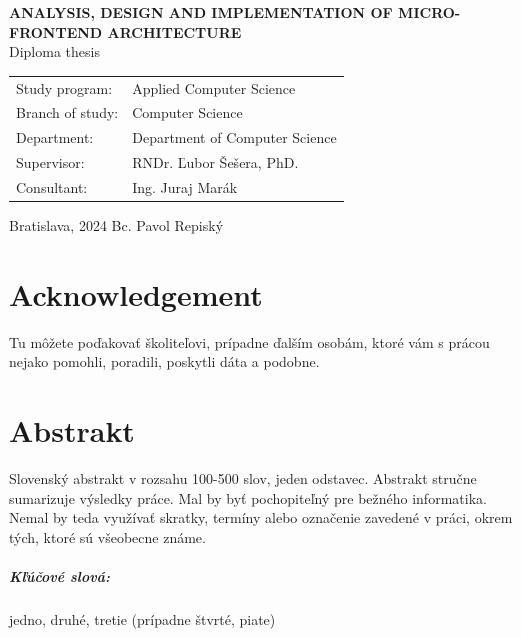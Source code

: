 \documentclass[12pt, twoside]{book}
\def\mfrok{2024}
\def\mftitle{Analysis, Design and Implementation of Micro-frontend Architecture}
\def\mfauthor{Bc. Pavol Repiský}
\def\mfskolitel{RNDr. Ľubor Šešera, PhD.}
\def\mfkonzultant{Ing. Juraj Marák}
\def\mfmiestocas{Bratislava, \mfrok}
\def\mftypprace{Diploma thesis}
\def\mfodbor{Computer Science}
\def\program{Applied Computer Science}
\def\mfpracovisko{Department of Computer Science}
\begin{document}
\begin{center}
	\textbf{\MakeUppercase{\Large\mftitle}}\\
	\mftypprace
\end{center}
\vfill


\begin{tabular}{l l}
Study program: & \program \\
Branch of study: & \mfodbor \\
Department: & \mfpracovisko \\
Supervisor: & \mfskolitel \\
Consultant: & \mfkonzultant \\
\end{tabular}

\vfill
\noindent
\mfmiestocas \hfill
\mfauthor
\cleardoublepage




\newpage
\setcounter{page}{2}




\newpage
\thispagestyle{empty}
\chapter*{Acknowledgement}\label{chap:thank_you}
Tu môžete poďakovať školiteľovi, prípadne
ďalším osobám, ktoré vám s prácou nejako pomohli, poradili,
poskytli dáta a podobne.

\vfill\eject 


\newpage 
\thispagestyle{empty}
\chapter*{Abstrakt}\label{chap:abstract_sk}
Slovenský abstrakt v rozsahu 100-500 slov, jeden odstavec. Abstrakt
stručne sumarizuje výsledky práce. Mal by byť pochopiteľný pre bežného
informatika. Nemal by teda využívať skratky, termíny alebo označenie
zavedené v práci, okrem tých, ktoré sú všeobecne známe.

\paragraph*{Kľúčové slová:} jedno, druhé, tretie (prípadne štvrté, piate)
\end{document}
